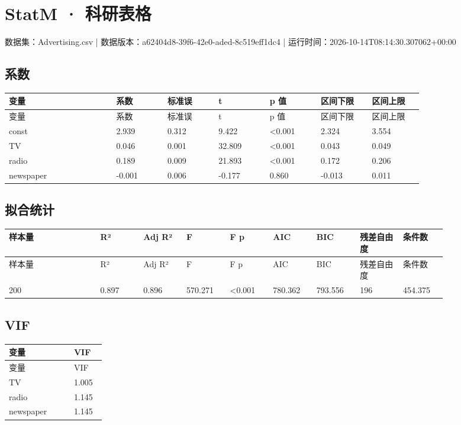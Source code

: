 \documentclass[UTF8]{ctexart}
\begin{document}
\section*{StatM · 科研表格}
数据集：Advertising.csv | 数据版本：a62404d8-39f6-42e0-aded-8c519eff1dc4 | 运行时间：2026-10-14T08:14:30.307062+00:00\par
{}
\subsection*{系数}
\small
\setlength{\tabcolsep}{2pt}
\begin{longtable}{p{0.2150\linewidth}p{0.1075\linewidth}p{0.1075\linewidth}p{0.1075\linewidth}p{0.1075\linewidth}p{0.1075\linewidth}p{0.1075\linewidth}}
\toprule
变量 & 系数 & 标准误 & t & p 值 & 区间下限 & 区间上限 \\
\midrule
\endfirsthead
\toprule
变量 & 系数 & 标准误 & t & p 值 & 区间下限 & 区间上限 \\
\midrule
\endhead
const & 2.939 & 0.312 & 9.422 & \textless{}0.001 & 2.324 & 3.554 \\
TV & 0.046 & 0.001 & 32.809 & \textless{}0.001 & 0.043 & 0.049 \\
radio & 0.189 & 0.009 & 21.893 & \textless{}0.001 & 0.172 & 0.206 \\
newspaper & -0.001 & 0.006 & -0.177 & 0.860 & -0.013 & 0.011 \\
\bottomrule
\end{longtable}
\subsection*{拟合统计}
\small
\setlength{\tabcolsep}{2pt}
\begin{longtable}{p{0.1720\linewidth}p{0.0860\linewidth}p{0.0860\linewidth}p{0.0860\linewidth}p{0.0860\linewidth}p{0.0860\linewidth}p{0.0860\linewidth}p{0.0860\linewidth}p{0.0860\linewidth}}
\toprule
样本量 & R² & Adj R² & F & F p & AIC & BIC & 残差自由度 & 条件数 \\
\midrule
\endfirsthead
\toprule
样本量 & R² & Adj R² & F & F p & AIC & BIC & 残差自由度 & 条件数 \\
\midrule
\endhead
200 & 0.897 & 0.896 & 570.271 & \textless{}0.001 & 780.362 & 793.556 & 196 & 454.375 \\
\bottomrule
\end{longtable}
\subsection*{VIF}
\small
\setlength{\tabcolsep}{2pt}
\begin{longtable}{p{0.5733\linewidth}p{0.2867\linewidth}}
\toprule
变量 & VIF \\
\midrule
\endfirsthead
\toprule
变量 & VIF \\
\midrule
\endhead
TV & 1.005 \\
radio & 1.145 \\
newspaper & 1.145 \\
\bottomrule
\end{longtable}
\end{document}
